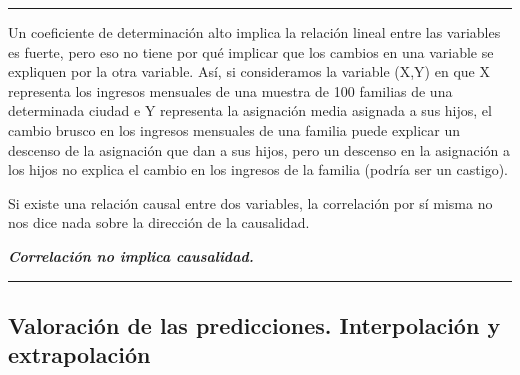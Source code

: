 \vspace{15mm} %
\begin{adjustwidth}{25pt}{25pt}
	\textcolor{gris}{\rule{70mm}{0.1mm}}
\vspace{5mm} %
	\begin{destacado}
	Un coeficiente de determinación alto implica la relación lineal entre las variables es fuerte, pero eso no tiene por qué implicar que los cambios en una variable se expliquen por la otra variable. Así, si consideramos la variable (X,Y) en que X representa los ingresos mensuales de una muestra de 100 familias de una determinada ciudad e Y representa la asignación media asignada a sus hijos, el cambio brusco en los ingresos mensuales de una familia puede explicar un descenso de la asignación que dan a sus hijos, pero un descenso en la asignación a los hijos no explica el cambio en los ingresos de la familia (podría ser un castigo).
	
	Si existe una relación causal entre dos variables, la correlación por sí misma no nos dice nada sobre la dirección de la causalidad.
	\begin{flushright}
		\textit{\textbf{Correlación no implica causalidad.}}
	\end{flushright} 
	\end{destacado}
	\begin{flushright}
	\rule{70mm}{0.1mm}	
	\end{flushright}
\end{adjustwidth}
\vspace{1cm}

\subsection{Valoración de las predicciones. Interpolación y extrapolación}

